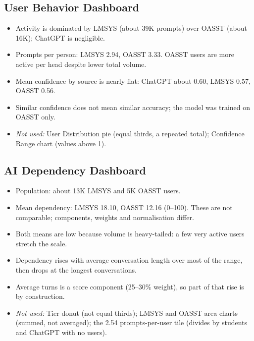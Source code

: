 \documentclass[11pt,a4paper]{article}
\renewcommand{\_}{\textunderscore\hspace{0pt}}
\begin{document}
\subsection{User Behavior Dashboard}
\begin{itemize}
  \item Activity is dominated by LMSYS (about 39K prompts) over OASST (about 16K); ChatGPT is negligible.
  \item Prompts per person: LMSYS 2.94, OASST 3.33. OASST users are more active per head despite lower total volume.
  \item Mean confidence by source is nearly flat: ChatGPT about 0.60, LMSYS 0.57, OASST 0.56.
  \item Similar confidence does not mean similar accuracy; the model was trained on OASST only.
  \item \emph{Not used:} User Distribution pie (equal thirds, a repeated total); Confidence Range chart (values above 1).
\end{itemize}

\subsection{AI Dependency Dashboard}
\begin{itemize}
  \item Population: about 13K LMSYS and 5K OASST users.
  \item Mean dependency: LMSYS 18.10, OASST 12.16 (0--100). These are not comparable; components, weights and normalisation differ.
  \item Both means are low because volume is heavy-tailed: a few very active users stretch the scale.
  \item Dependency rises with average conversation length over most of the range, then drops at the longest conversations.
  \item Average turns is a score component (25--30\% weight), so part of that rise is by construction.
  \item \emph{Not used:} Tier donut (not equal thirds); LMSYS and OASST area charts (summed, not averaged); the 2.54 prompts-per-user tile (divides by students and ChatGPT with no users).
\end{itemize}
\end{document}
